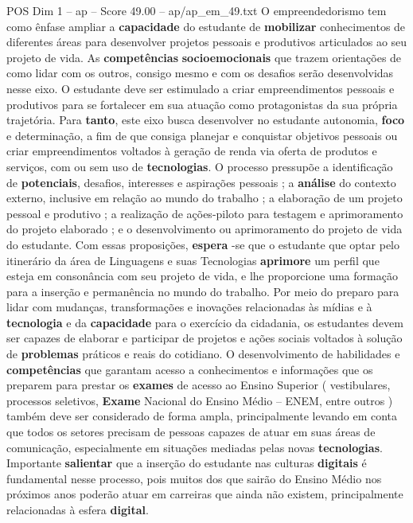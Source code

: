 \begin{textsample}{POS Dim 1 – ap – Score 49.00 – ap/ap\_em\_49.txt}
O empreendedorismo tem como ênfase ampliar a \textbf{capacidade} do estudante de \textbf{mobilizar} conhecimentos de diferentes áreas para desenvolver projetos pessoais e produtivos articulados ao seu projeto de vida.
As \textbf{competências} \textbf{socioemocionais} que trazem orientações de como lidar com os outros, consigo mesmo e com os desafios serão desenvolvidas nesse eixo.
O estudante deve ser estimulado a criar empreendimentos pessoais e produtivos para se fortalecer em sua atuação como protagonistas da sua própria trajetória.
Para \textbf{tanto}, este eixo busca desenvolver no estudante autonomia, \textbf{foco} e determinação, a fim de que consiga planejar e conquistar objetivos pessoais ou criar empreendimentos voltados à geração de renda via oferta de produtos e serviços, com ou sem uso de \textbf{tecnologias}.
O processo pressupõe a identificação de \textbf{potenciais}, desafios, interesses e aspirações pessoais ; a \textbf{análise} do contexto externo, inclusive em relação ao mundo do trabalho ; a elaboração de um projeto pessoal e produtivo ; a realização de ações-piloto para testagem e aprimoramento do projeto elaborado ; e o desenvolvimento ou aprimoramento do projeto de vida do estudante.
Com essas proposições, \textbf{espera} -se que o estudante que optar pelo itinerário da área de Linguagens e suas Tecnologias \textbf{aprimore} um perfil que esteja em consonância com seu projeto de vida, e lhe proporcione uma formação para a inserção e permanência no mundo do trabalho.
Por meio do preparo para lidar com mudanças, transformações e inovações relacionadas às mídias e à \textbf{tecnologia} e da \textbf{capacidade} para o exercício da cidadania, os estudantes devem ser capazes de elaborar e participar de projetos e ações sociais voltados à solução de \textbf{problemas} práticos e reais do cotidiano.
O desenvolvimento de habilidades e \textbf{competências} que garantam acesso a conhecimentos e informações que os preparem para prestar os \textbf{exames} de acesso ao Ensino Superior ( vestibulares, processos seletivos, \textbf{Exame} Nacional do Ensino Médio – ENEM, entre outros ) também deve ser considerado de forma ampla, principalmente levando em conta que todos os setores precisam de pessoas capazes de atuar em suas áreas de comunicação, especialmente em situações mediadas pelas novas \textbf{tecnologias}.
Importante \textbf{salientar} que a inserção do estudante nas culturas \textbf{digitais} é fundamental nesse processo, pois muitos dos que sairão do Ensino Médio nos próximos anos poderão atuar em carreiras que ainda não existem, principalmente relacionadas à esfera \textbf{digital}.

\end{textsample}

